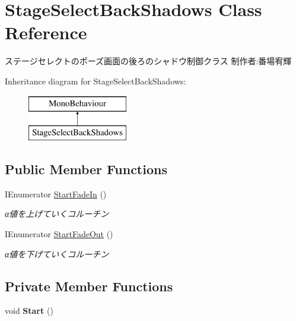 \hypertarget{class_stage_select_back_shadows}{}\section{Stage\+Select\+Back\+Shadows Class Reference}
\label{class_stage_select_back_shadows}


ステージセレクトのポーズ画面の後ろのシャドウ制御クラス 制作者\+:番場宥輝  


Inheritance diagram for Stage\+Select\+Back\+Shadows\+:\begin{figure}[H]
\begin{center}
\leavevmode
\includegraphics[height=2.000000cm]{class_stage_select_back_shadows}
\end{center}
\end{figure}
\subsection*{Public Member Functions}
\begin{DoxyCompactItemize}
\item 
I\+Enumerator \hyperlink{class_stage_select_back_shadows_a326d3770dd525ced267654607927c818}{Start\+Fade\+In} ()
\begin{DoxyCompactList}\small\item\em α値を上げていくコルーチン \end{DoxyCompactList}\item 
I\+Enumerator \hyperlink{class_stage_select_back_shadows_afd22cce3c06d1a0710729861de03d627}{Start\+Fade\+Out} ()
\begin{DoxyCompactList}\small\item\em α値を下げていくコルーチン \end{DoxyCompactList}\end{DoxyCompactItemize}
\subsection*{Private Member Functions}
\begin{DoxyCompactItemize}
\item 
\mbox{\label{class_stage_select_back_shadows_a92cd3f8dd1a870a58f675d16b0ad7427}} 
void {\bfseries Start} ()
\end{DoxyCompactItemize}
